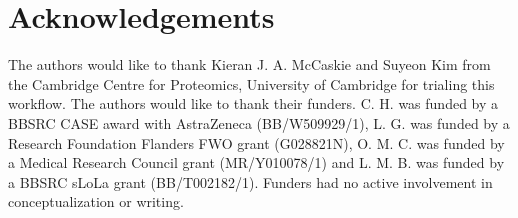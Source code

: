 \documentclass[9pt,a4paper,]{extarticle}
\begin{document}
\section{Acknowledgements}\label{acknowledgements}

The authors would like to thank Kieran J. A. McCaskie and Suyeon Kim from the
Cambridge Centre for Proteomics, University of Cambridge for trialing this workflow.
The authors would like to thank their funders. C. H. was funded by a BBSRC CASE
award with AstraZeneca (BB/W509929/1), L. G. was funded by a Research Foundation
Flanders FWO grant (G028821N), O. M. C. was funded by a Medical Research Council
grant (MR/Y010078/1) and L. M. B. was funded by a BBSRC sLoLa grant (BB/T002182/1).
Funders had no active involvement in conceptualization or writing.

\renewcommand\refname{References}
{\small}
\end{document}
